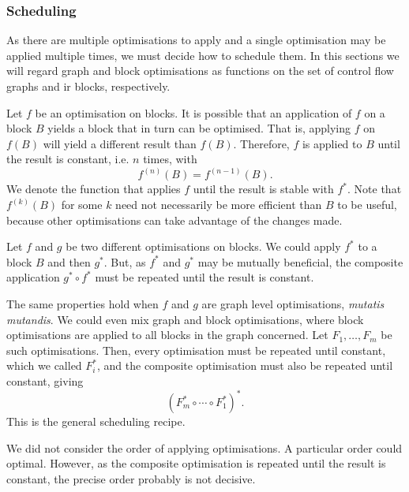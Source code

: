 \subsubsection*{Scheduling}
As there are multiple optimisations to apply and a single optimisation may be applied multiple times, we must decide how to schedule them. In this sections we will regard graph and block optimisations as functions on the set of control flow graphs and ir blocks, respectively.

Let $f$ be an optimisation on blocks. It is possible that an application of $f$ on a block $B$ yields a block that in turn can be optimised. That is, applying $f$ on $f(B)$ will yield a different result than $f(B)$. Therefore, $f$ is applied to $B$ until the result is constant, i.e. $n$ times, with $$f^{(n)}(B) = f^{(n-1)}(B).$$ We denote the function that applies $f$ until the result is stable with $f^*$. Note that $f^{(k)}(B)$ for some $k$ need not necessarily be more efficient than $B$ to be useful, because other optimisations can take advantage of the changes made.

Let $f$ and $g$ be two different optimisations on blocks. We could apply $f^*$ to a block $B$ and then $g^*$. But, as $f^*$ and $g^*$ may be mutually beneficial, the composite application $g^* \circ f^*$ must be repeated until the result is constant.

The same properties hold when $f$ and $g$ are graph level optimisations, \emph{mutatis mutandis}. We could even mix graph and block optimisations, where block optimisations are applied to all blocks in the graph concerned. Let $F_1, \ldots, F_m$ be such optimisations. Then, every optimisation must be repeated until constant, which we called $F_i^*$, and the composite optimisation must also be repeated until constant, giving $${(F_m^* \circ \cdots \circ F_1^*)}^*.$$ This is the general scheduling recipe.

We did not consider the order of applying optimisations. A particular order could optimal. However, as the composite optimisation is repeated until the result is constant, the precise order probably is not decisive.


